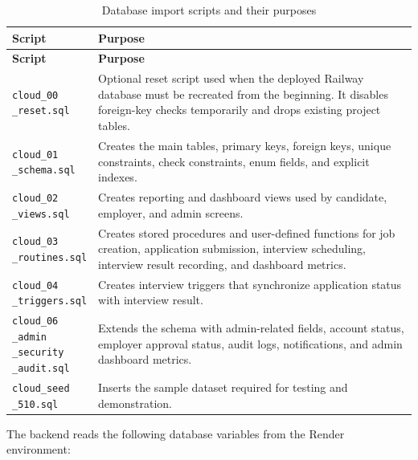 \documentclass[11pt,a4paper]{report}
\makeatletter
\newcommand{\codebreak}[1]{\begin{tabular}[t]{@{}l@{}}#1\end{tabular}}
\makeatother
\begin{document}
\begin{longtable}{L{0.28\textwidth}L{0.62\textwidth}}
\caption{Database import scripts and their purposes}
\label{tab:database-scripts}\\
\toprule
\textbf{Script} & \textbf{Purpose} \\
\midrule
\endfirsthead
\toprule
\textbf{Script} & \textbf{Purpose} \\
\midrule
\endhead
\codebreak{\texttt{cloud\_00}\\\texttt{\_reset.sql}} & Optional reset script used when the deployed Railway database must be recreated from the beginning. It disables foreign-key checks temporarily and drops existing project tables. \\
\codebreak{\texttt{cloud\_01}\\\texttt{\_schema.sql}} & Creates the main tables, primary keys, foreign keys, unique constraints, check constraints, enum fields, and explicit indexes. \\
\codebreak{\texttt{cloud\_02}\\\texttt{\_views.sql}} & Creates reporting and dashboard views used by candidate, employer, and admin screens. \\
\codebreak{\texttt{cloud\_03}\\\texttt{\_routines.sql}} & Creates stored procedures and user-defined functions for job creation, application submission, interview scheduling, interview result recording, and dashboard metrics. \\
\codebreak{\texttt{cloud\_04}\\\texttt{\_triggers.sql}} & Creates interview triggers that synchronize application status with interview result. \\
\codebreak{\texttt{cloud\_06}\\\texttt{\_admin}\\\texttt{\_security}\\\texttt{\_audit.sql}} & Extends the schema with admin-related fields, account status, employer approval status, audit logs, notifications, and admin dashboard metrics. \\
\codebreak{\texttt{cloud\_seed}\\\texttt{\_510.sql}} & Inserts the sample dataset required for testing and demonstration. \\
\bottomrule
\end{longtable}

The backend reads the following database variables from the Render environment:
\end{document}
